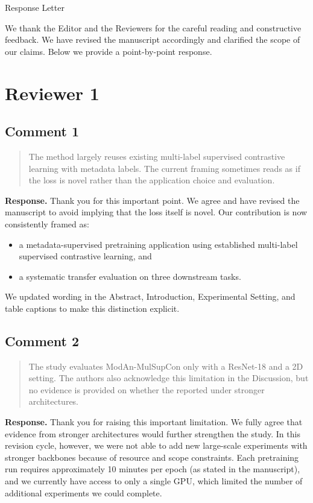 \documentclass[11pt]{article}
\begin{document}
\begin{center}
{\LARGE Response Letter}
\end{center}

We thank the Editor and the Reviewers for the careful reading and constructive feedback.
We have revised the manuscript accordingly and clarified the scope of our claims.
Below we provide a point-by-point response.

\section*{Reviewer 1}

\subsection*{Comment 1}
\begin{quote}
The method largely reuses existing multi-label supervised contrastive learning with metadata labels.
The current framing sometimes reads as if the loss is novel rather than the application choice and evaluation.
\end{quote}

\textbf{Response.}
Thank you for this important point. We agree and have revised the manuscript to avoid implying that the loss itself is novel.
Our contribution is now consistently framed as:
\begin{itemize}[leftmargin=1.5em,noitemsep,topsep=0.3em]
\item a metadata-supervised pretraining application using established multi-label supervised contrastive learning, and
\item a systematic transfer evaluation on three downstream tasks.
\end{itemize}
We updated wording in the Abstract, Introduction, Experimental Setting, and table captions to make this distinction explicit.

\subsection*{Comment 2}
\begin{quote}
The study evaluates ModAn-MulSupCon only with a ResNet-18 and a 2D setting.
The authors also acknowledge this limitation in the Discussion, but no evidence is provided on whether the reported under stronger architectures.
\end{quote}

\textbf{Response.}
Thank you for raising this important limitation.
We fully agree that evidence from stronger architectures would further strengthen the study.
In this revision cycle, however, we were not able to add new large-scale experiments with stronger backbones because of resource and scope constraints.
Each pretraining run requires approximately 10 minutes per epoch (as stated in the manuscript), and we currently have access to only a single GPU, which limited the number of additional experiments we could complete.
\end{document}
